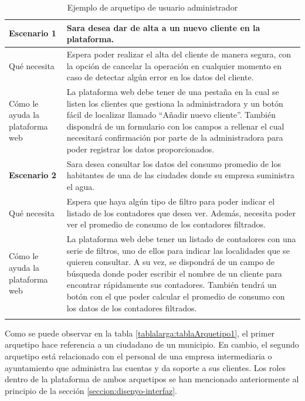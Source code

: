 \documentclass[pdftex,11pt,a4paper]{book}
\begin{document}
\begin{center}
\begin{longtable}{|m{3cm}|m{11cm}|}
\hline

\textbf{Escenario 1} & Sara desea dar de alta a un nuevo cliente en la plataforma.
\\ \hline
Qué necesita & Espera poder realizar el alta del cliente de manera segura, con la opción de cancelar la operación en cualquier momento en caso de detectar algún error en los datos del cliente.
\\ \hline
\raggedright{Cómo le ayuda la \mbox{plataforma} web} & La plataforma web debe tener de una pestaña en la cual se listen los clientes que gestiona la administradora y un botón fácil de localizar llamado “Añadir nuevo cliente”. \break \break
También dispondrá de un formulario con los campos a rellenar el cual necesitará confirmación por parte de la administradora para poder registrar los datos proporcionados.
\\ \hline
\textbf{Escenario 2} & Sara desea consultar los datos del consumo promedio de los habitantes de una de las ciudades donde su empresa suministra el agua.    
\\ \hline
Qué necesita & Espera que haya algún tipo de filtro para poder indicar el listado de los contadores que desea ver.
Además, necesita poder ver el promedio de consumo de los contadores filtrados.
\\ \hline
\raggedright{Cómo le ayuda la \mbox{plataforma} web} & La plataforma web debe tener un listado de contadores con una serie de filtros, uno de ellos para indicar las localidades que se quieren consultar. \break \break
A su vez, se dispondrá de un campo de búsqueda donde poder escribir el nombre de un cliente para encontrar rápidamente sus contadores. \break \break
También tendrá un botón con el que poder calcular el promedio de consumo con los datos de los contadores filtrados.
\\ \hline
\caption{Ejemplo de arquetipo de usuario administrador} \label{tablalarga:tablaArquetipo2}
\end{longtable}
\end{center}
\vspace{-1,5cm}

Como se puede observar en la tabla \ref{tablalarga:tablaArquetipo1}, el primer arquetipo hace referencia a un ciudadano de un municipio. En cambio, el segundo arquetipo está relacionado con el personal de una empresa intermediaria o ayuntamiento que administra las cuentas y da soporte a sus clientes. Los roles dentro de la plataforma de ambos arquetipos se han mencionado anteriormente al principio de la sección \ref{seccion:disenyo-interfaz}.
\end{document}
